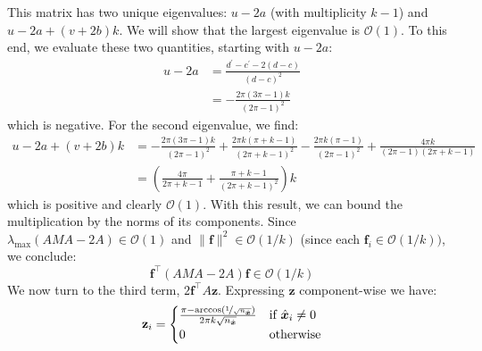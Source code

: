 This matrix has two unique eigenvalues: $u-2a$ (with multiplicity $k-1$) and $u-2a + (v+2b)k$. We will show that the largest eigenvalue is $\mathcal{O}(1)$. To this end, we evaluate these two quantities, starting with $u - 2a$:
\begin{align*}
    u-2a &= \frac{d^\prime - c^\prime -2(d-c)}{(d-c)^2}\\
    &=-\frac{2\pi(3\pi-1)k}{(2\pi-1)^2}
\end{align*}
which is negative. For the second eigenvalue, we find:
\begin{align*}
    u-2a + (v+2b)k &= -\frac{2\pi(3\pi-1)k}{(2\pi-1)^2} + \frac{2\pi k\left(\pi+k-1\right)}{\left(2\pi+ k-1\right)^2}-\frac{2\pi k(\pi-1)}{\left(2\pi-1\right)^2} + \frac{4\pi k}{\left(2\pi-1\right)\left(2\pi+k-1\right)}\\
    &= \left(\frac{4\pi}{2\pi+k-1} + \frac{\pi+k-1}{(2\pi+k-1)^2}\right)k
\end{align*}
which is positive and clearly $\mathcal{O}(1)$. With this result, we can bound the multiplication by the norms of its components. Since $\lambda_{\max}(AMA - 2A) \in \mathcal{O}(1)$ and $\|\mathbf{f}\|^2 \in \mathcal{O}\left(1/k\right)$ (since each $\mathbf{f}_i \in \mathcal{O}\left(1/k\right))$, we conclude:
$$
\mathbf{f}^\top (AMA - 2A) \mathbf{f} \in \mathcal{O}\left( 1/k \right)
$$
We now turn to the third term, $2\mathbf{f}^\top A \mathbf{z}$. Expressing $\mathbf{z}$ component-wise we have:
\begin{equation*}
    \mathbf{z}_i = \begin{cases}
        \frac{\pi-\arccos\left(\nicefrac{1}{\sqrt{n_{\hat{\boldsymbol{x}}}}}\right)}{2\pi k \sqrt{n_{\hat{\boldsymbol{x}}}}} &\textrm{if } \hat{\boldsymbol{x}}_i \neq 0\\
        0 &\textrm{otherwise}
    \end{cases}
\end{equation*}

